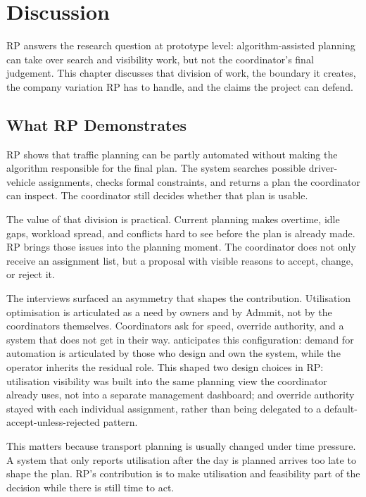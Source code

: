 \chapter{Discussion}
\label{chap:discussion}

RP answers the research question at prototype level: algorithm-assisted planning can take over search and visibility work, but not the coordinator's final judgement. This chapter discusses that division of work, the boundary it creates, the company variation RP has to handle, and the claims the project can defend.


\section{What RP Demonstrates}
\label{sec:primary-findings}
\label{sec:efficiency}

RP shows that traffic planning can be partly automated without making the algorithm responsible for the final plan. The system searches possible driver-vehicle assignments, checks formal constraints, and returns a plan the coordinator can inspect. The coordinator still decides whether that plan is usable.

The value of that division is practical. Current planning makes overtime, idle gaps, workload spread, and conflicts hard to see before the plan is already made. RP brings those issues into the planning moment. The coordinator does not only receive an assignment list, but a proposal with visible reasons to accept, change, or reject it.

The interviews surfaced an asymmetry that shapes the contribution. Utilisation optimisation is articulated as a need by owners and by Admmit, not by the coordinators themselves. Coordinators ask for speed, override authority, and a system that does not get in their way. \textcite{bainbridge1983ironies} anticipates this configuration: demand for automation is articulated by those who design and own the system, while the operator inherits the residual role. This shaped two design choices in RP: utilisation visibility was built into the same planning view the coordinator already uses, not into a separate management dashboard; and override authority stayed with each individual assignment, rather than being delegated to a default-accept-unless-rejected pattern.

This matters because transport planning is usually changed under time pressure. A system that only reports utilisation after the day is planned arrives too late to shape the plan. RP's contribution is to make utilisation and feasibility part of the decision while there is still time to act.

